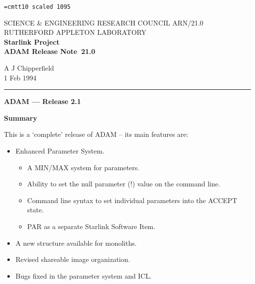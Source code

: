 \pagestyle{myheadings}

\newcommand{\stardoccategory}  {ADAM Release Note}
\newcommand{\stardocinitials}  {ARN}
\newcommand{\stardocnumber}    {21.0}
\newcommand{\stardocauthors}   {A J Chipperfield}
\newcommand{\stardocdate}      {1 Feb 1994}
\newcommand{\stardoctitle}     {ADAM --- Release 2.1}

\newcommand{\stardocname}{\stardocinitials /\stardocnumber}
\markright{\stardocname}
\setlength{\textwidth}{160mm}
\setlength{\textheight}{230mm}
\setlength{\topmargin}{-2mm}
\setlength{\oddsidemargin}{0mm}
\setlength{\evensidemargin}{0mm}
\setlength{\parindent}{0mm}
\setlength{\parskip}{\medskipamount}
\setlength{\unitlength}{1mm}


\font\tt=cmtt10 scaled 1095
\renewcommand{\_}{{\tt\char'137}}


\thispagestyle{empty}
SCIENCE \& ENGINEERING RESEARCH COUNCIL \hfill \stardocname\\
RUTHERFORD APPLETON LABORATORY\\
{\large\bf Starlink Project\\}
{\large\bf \stardoccategory\ \stardocnumber}
\begin{flushright}
\stardocauthors\\
\stardocdate
\end{flushright}
\vspace{-4mm}
\rule{\textwidth}{0.5mm}
\vspace{5mm}
\begin{center}
{\Large\bf \stardoctitle}
\end{center}
\vspace{20mm}
\begin{center}
{\Large\bf Summary}
\end{center}
This is a `complete' release of ADAM -- its main features are:
\begin{itemize}
\item Enhanced Parameter System.
\begin{itemize}
\item A MIN/MAX system for parameters.
\item Ability to set the null parameter (!) value on the command line.
\item Command line syntax to set individual parameters into the ACCEPT state.
\item PAR as a separate Starlink Software Item.
\end{itemize}
\item A new structure available for monoliths.
\item Revised shareable image organization.
\item Bugs fixed in the parameter system and ICL.
\end{itemize}

